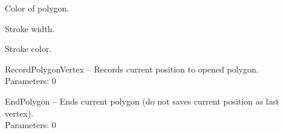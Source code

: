 \begin{description*}
			\begin{enumerate*}
				\item
Color of polygon.				\item
            Stroke width.				\item
            Stroke color.			\end{enumerate*}
		\item[RecordPolygonVertex]
			-- Records current position to opened polygon.
		\\ Parameters: 0 
		\item[EndPolygon]
			-- Ends current polygon (do not saves current position as last vertex).
		\\ Parameters: 0 
	\end{description*}

